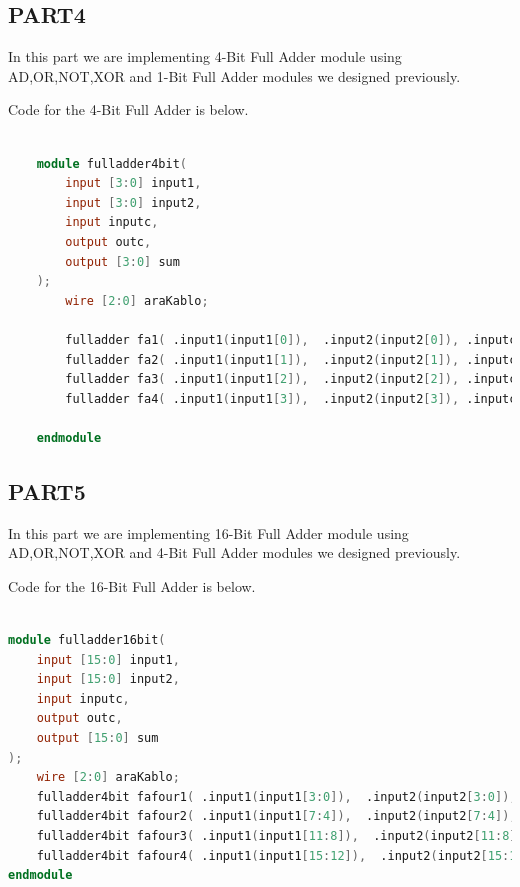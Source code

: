 \documentclass[pdftex,12pt,a4paper]{article}
\begin{document}
\subsection{PART4}
In this part we are implementing 4-Bit Full Adder module using AD,OR,NOT,XOR and 1-Bit Full Adder modules we designed previously.

Code for the 4-Bit Full Adder is below.

\begin{lstlisting}[language = Verilog]

    module fulladder4bit(
        input [3:0] input1,
        input [3:0] input2,
        input inputc,
        output outc,
        output [3:0] sum
    );
        wire [2:0] araKablo;
    
        fulladder fa1( .input1(input1[0]),  .input2(input2[0]), .inputc(inputc), .outc(araKablo[0]), .sum(sum[0])  );
        fulladder fa2( .input1(input1[1]),  .input2(input2[1]), .inputc(araKablo[0]), .outc(araKablo[1]), .sum(sum[1])  );
        fulladder fa3( .input1(input1[2]),  .input2(input2[2]), .inputc(araKablo[1]), .outc(araKablo[2]), .sum(sum[2])  );
        fulladder fa4( .input1(input1[3]),  .input2(input2[3]), .inputc(araKablo[2]), .outc(outc), .sum(sum[3])  );
    
    endmodule
\end{lstlisting}


\subsection{PART5}
In this part we are implementing 16-Bit Full Adder module using AD,OR,NOT,XOR and 4-Bit Full Adder modules we designed previously.

Code for the 16-Bit Full Adder is below.

\begin{lstlisting}[language = Verilog]

module fulladder16bit(
    input [15:0] input1,
    input [15:0] input2,
    input inputc,
    output outc,
    output [15:0] sum
);
    wire [2:0] araKablo;
    fulladder4bit fafour1( .input1(input1[3:0]),  .input2(input2[3:0]), .inputc(inputc), .outc(araKablo[0]), .sum(sum[3:0])  );
    fulladder4bit fafour2( .input1(input1[7:4]),  .input2(input2[7:4]), .inputc(araKablo[0]), .outc(araKablo[1]), .sum(sum[7:4])  );
    fulladder4bit fafour3( .input1(input1[11:8]),  .input2(input2[11:8]), .inputc(araKablo[1]), .outc(araKablo[2]), .sum(sum[11:8])  );
    fulladder4bit fafour4( .input1(input1[15:12]),  .input2(input2[15:12]), .inputc(araKablo[2]), .outc(outc), .sum(sum[15:12])  );
endmodule

\end{lstlisting}
\end{document}
